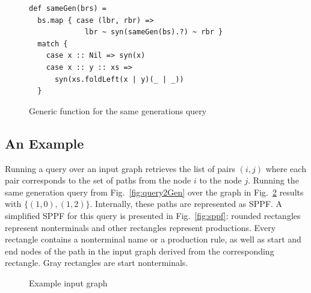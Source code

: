\begin{figure}[h]
\begin{lstlisting}
def sameGen(brs) =
  bs.map { case (lbr, rbr) => 
             lbr ~ syn(sameGen(bs).?) ~ rbr } 
  match {
    case x :: Nil => syn(x)
    case x :: y :: xs => 
      syn(xs.foldLeft(x | y)(_ | _))
  }
\end{lstlisting}
\caption{Generic function for the same generations query}
\label{fig:gen}
\end{figure}

\subsection{An Example}

Running a query over an input graph retrieves the list of pairs $(i, j)$ where each pair corresponds to the set of paths from the node $i$ to the node $j$. 
Running the same generation query from Fig.~\ref{fig:query2Gen} over the graph in Fig.~\ref{fig:graph} results with $\{(1,0), (1,2)\}$. 
Internally, these paths are represented as SPPF. 
A simplified SPPF for this query is presented in Fig.~\ref{fig:sppf}: rounded rectangles represent nonterminals and other rectangles represent productions. 
Every rectangle contains a nonterminal name or a production rule, as well as start and end nodes of the path in the input graph derived from the corresponding rectangle. 
Gray rectangles are start nonterminals.

\begin{figure}[h]

\caption{Example input graph}
\label{fig:graph}
\end{figure}

